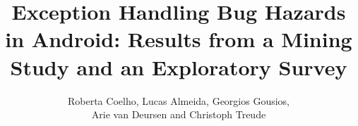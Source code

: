 \documentclass[letterpaper,twoside,10pt]{book}
\title{Exception Handling Bug Hazards in Android: 
Results from a Mining Study and an Exploratory Survey}
\author{Roberta Coelho, Lucas Almeida, Georgios Gousios,\\ Arie van Deursen and Christoph Treude}
\begin{document}
\maketitle

%



\makebackpage
\end{document}
